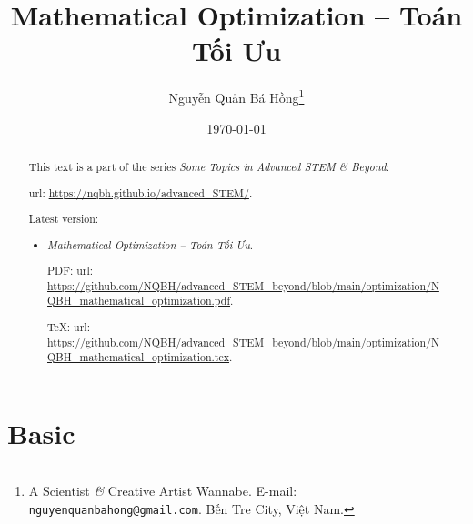 \documentclass{article}
\title{Mathematical Optimization -- Toán Tối Ưu}
\author{Nguyễn Quản Bá Hồng\footnote{A Scientist {\it\&} Creative Artist Wannabe. E-mail: {\tt nguyenquanbahong@gmail.com}. Bến Tre City, Việt Nam.}}
\date{\today}
\begin{document}
\maketitle
\begin{abstract}
	This text is a part of the series {\it Some Topics in Advanced STEM \& Beyond}:
	
	{\sc url}: \url{https://nqbh.github.io/advanced_STEM/}.
	
	Latest version:
	\begin{itemize}
		\item {\it Mathematical Optimization -- Toán Tối Ưu}.
		
		PDF: {\sc url}: \url{https://github.com/NQBH/advanced_STEM_beyond/blob/main/optimization/NQBH_mathematical_optimization.pdf}.
		
		\TeX: {\sc url}: \url{https://github.com/NQBH/advanced_STEM_beyond/blob/main/optimization/NQBH_mathematical_optimization.tex}.
	\end{itemize}
\end{abstract}
\tableofcontents


\section{Basic}

\end{document}
